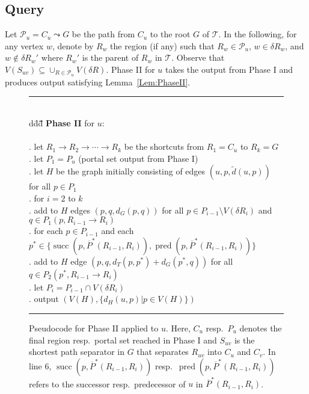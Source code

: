 \documentclass[11pt]{article}
\def\succ{\operatorname{succ}}
\def\pred{\operatorname{pred}}
\begin{document}
\subsection{Query}
Let $\mathcal P_u = C_u\leadsto G$ be the path from $C_u$ to the root $G$ of $\mathcal T$. In the following, for any vertex $w$, denote by $R_w$ the region (if any) such that $R_w\in\mathcal P_u$, $w\in\delta R_w$, and $w\notin\delta R_w'$ where $R_w'$ is the parent of $R_w$ in $\mathcal T$. Observe that $V(S_{uv})\subseteq\cup_{R\in\mathcal P_u}V(\delta R)$. Phase II for $u$ takes the output from Phase I and produces output satisfying Lemma~\ref{Lem:PhaseII}.
\begin{figure}[!ht]
\begin{tabbing}
\rule{\linewidth}{\arrayrulewidth}\\
d\=dd\=\quad\=\quad\=\quad\=\quad\=\quad\=\quad\=\quad\=\quad\=\quad\=\quad\=\quad\=\kill
\>\textbf{Phase II} for $u$:\\\\
. \>\>let $R_1\rightarrow R_2\rightarrow\cdots\rightarrow R_k$ be the shortcuts from $R_1 = C_u$ to $R_k = G$\\
. \>\>let $P_1 = P_u$ (portal set output from Phase I)\\
. \>\>let $H$ be the graph initially consisting of edges $(u,p,\tilde{d}(u,p))$ for all $p\in P_1$\\
. \>\>for $i = 2$ to $k$\\
. \>\>\>add to $H$ edges $(p,q,d_G(p,q))$ for all $p\in P_{i-1}\setminus V(\delta R_i)$ and $q\in P_1(p,R_{i-1}\rightarrow R_i)$\\
. \>\>\>for each $p\in P_{i-1}$ and each $p^*\in\{\succ(p,\overline P^*(R_{i-1},R_i)),\pred(p,\overline P^*(R_{i-1},R_i))\}$\\
. \>\>\>\>add to $H$ edge $(p,q,d_T(p,p^*)+d_G(p^*,q))$ for all $q\in P_2(p^*,R_{i-1}\rightarrow R_i)$\\
. \>\>\>let $P_i = P_{i-1}\cap V(\delta R_i)$\\
. \>\>output $(V(H),\{d_H(u,p) | p\in V(H)\})$\\
\rule{\linewidth}{\arrayrulewidth}
\end{tabbing}
\caption{Pseudocode for Phase II applied to $u$. Here, $C_u$ resp.~$P_u$ denotes the final region resp.~portal set reached in Phase I and $S_{uv}$ is the shortest path separator in $G$ that separates $R_{uv}$ into $C_u$ and $C_v$. In line $6$, $\succ(p,\overline P^*(R_{i-1},R_i))$ resp.~$\pred(p,\overline P^*(R_{i-1},R_i))$ refers to the successor resp.~predecessor of $u$ in $\overline P^*(R_{i-1},R_i)$.}\label{fig:PhaseII}
\end{figure}
\end{document}
